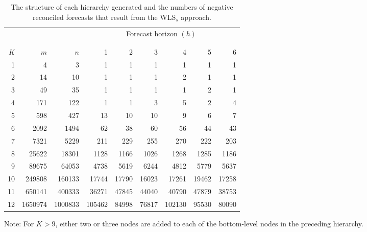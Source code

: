 \documentclass[11pt]{article}
\newcommand{\0}{\phantom{0}}
\begin{document}
\begin{table}[ht]
	\caption{The structure of each hierarchy generated and the numbers of negative reconciled forecasts that result from the WLS$_{s}$ approach.}
	\label{tbl:negstrwls}
	\centering
	\begin{threeparttable}
		\begin{tabular}{rrrrrrrrr}
			\toprule
			    &         &         & \multicolumn{6}{c}{Forecast horizon $(h)$}                                          \\[-0.3cm]\\\cline{4-9}\\[-0.3cm]
			$K$ & $m$     & $n$     & 1                                          & 2     & 3     & 4      & 5     & 6     \\
			\midrule
			1   & 4       & 3       & 1                                          & 1     & 1     & 1      & 1     & 1     \\
			2   & 14      & 10      & 1                                          & 1     & 1     & 2      & 1     & 1     \\
			3   & 49      & 35      & 1                                          & 1     & 1     & 1      & 2     & 1     \\
			4   & 171     & 122     & 1                                          & 1     & 3     & 5      & 2     & 4     \\
			5   & 598     & 427     & 13                                         & 10    & 10    & 9      & 6     & 7     \\
			6   & 2092    & 1494    & 62                                         & 38    & 60    & 56     & 44    & 43    \\
			7   & 7321    & 5229    & 211                                        & 229   & 255   & 270    & 222   & 203   \\
			8   & 25622   & 18301   & 1128                                       & 1166  & 1026  & 1268   & 1285  & 1186  \\
			9   & 89675   & 64053   & 4738                                       & 5619  & 6244  & 4812   & 5779  & 5637  \\
			10  & 249808  & 160133  & 17744                                      & 17790 & 16023 & 17261  & 19462 & 17258 \\
			11  & 650141  & 400333  & 36271                                      & 47845 & 44040 & 40790  & 47879 & 38753 \\
			12  & 1650974 & 1000833 & 105462                                     & 84998 & 76817 & 102130 & 95530 & 80090 \\
			\bottomrule
		\end{tabular}
		\begin{tablenotes}
			\item [] Note: For $K > 9$, either two or three nodes are added to each of the bottom-level nodes in the preceding hierarchy.
		\end{tablenotes}
	\end{threeparttable}
\end{table}
\end{document}
